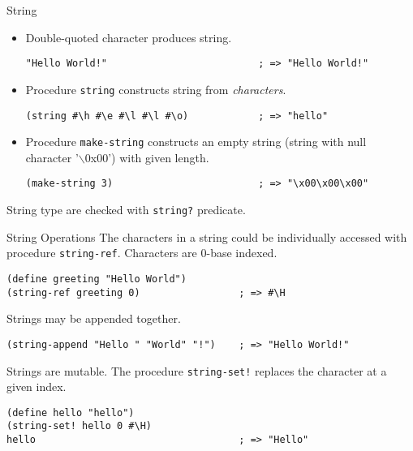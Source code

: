 \documentclass[presentation]{beamer}
\begin{document}
\begin{frame}[fragile,label={sec:orgheadline28}]{String}
 \begin{itemize}
\item Double-quoted character produces string.

\begin{verbatim}
"Hello World!"                          ; => "Hello World!"
\end{verbatim}

\item Procedure \texttt{string} constructs string from \emph{characters}.

\begin{verbatim}
(string #\h #\e #\l #\l #\o)            ; => "hello"
\end{verbatim}

\item Procedure \texttt{make-string} constructs an empty string (string with
null character '$\backslash$0x00') with given length.

\begin{verbatim}
(make-string 3)                         ; => "\x00\x00\x00"
\end{verbatim}
\end{itemize}

String type are checked with \texttt{string?} predicate.
\end{frame}

\begin{frame}[fragile,label={sec:orgheadline29}]{String Operations}
 The characters in a string could be individually accessed with
procedure \texttt{string-ref}.  Characters are 0-base indexed.

\begin{verbatim}
(define greeting "Hello World")
(string-ref greeting 0)                 ; => #\H
\end{verbatim}

Strings may be appended together.

\begin{verbatim}
(string-append "Hello " "World" "!")    ; => "Hello World!"
\end{verbatim}

Strings are mutable.  The procedure \texttt{string-set!} replaces the
character at a given index.

\begin{verbatim}
(define hello "hello")
(string-set! hello 0 #\H)
hello                                   ; => "Hello"
\end{verbatim}
\end{frame}
\end{document}

